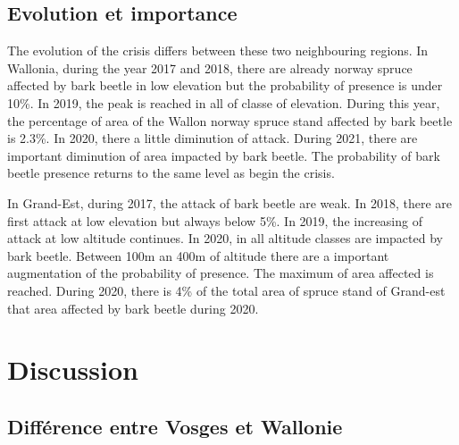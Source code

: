 \documentclass[3p,procedia]{elsarticle}
\begin{document}



\subsection{Evolution et importance}

The evolution of the crisis differs between these two neighbouring regions. 
In Wallonia, during the year 2017 and 2018, there are already norway spruce affected by bark beetle in low elevation but the probability of presence is under 10\%. 
In 2019, the peak is reached in all of classe of elevation. During this year, the percentage of area of the Wallon norway spruce stand affected by bark beetle is 2.3\%.
In 2020, there a  little diminution of attack. 
During 2021, there are important diminution of area impacted by bark beetle. The probability of bark beetle presence returns to the same level as begin the crisis.

In Grand-Est, during 2017, the attack of bark beetle are weak. 
In 2018, there are first attack at low elevation but always below 5\%.
In 2019, the increasing of attack at low altitude continues.
In 2020, in all altitude classes are impacted by bark beetle. 
Between 100m an 400m of altitude there are a important augmentation of the probability of presence. 
The maximum of area affected is reached. %
During 2020, there is 4\% of the total area of spruce stand of Grand-est that area affected by bark beetle during 2020.

 
  




\section{Discussion}

\subsection{Différence entre Vosges et Wallonie}
	
\end{document}
